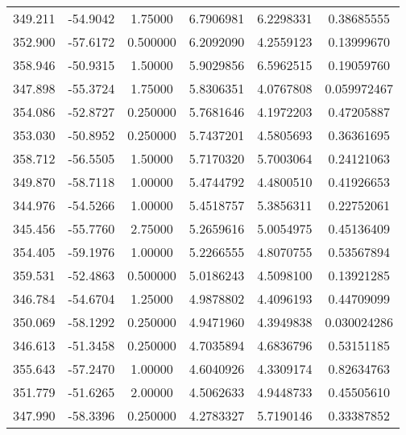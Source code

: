 \documentclass{article}
\begin{document}
\begin{tabular}{| c | c | c | c | c | c |}
      349.211 &      -54.9042 &       1.75000 &        6.7906981 & 
       6.2298331 &       0.38685555\\
      352.900 &      -57.6172 &      0.500000 &        6.2092090 & 
       4.2559123 &       0.13999670\\
      358.946 &      -50.9315 &       1.50000 &        5.9029856 & 
       6.5962515 &       0.19059760\\
      347.898 &      -55.3724 &       1.75000 &        5.8306351 & 
       4.0767808 &      0.059972467\\
      354.086 &      -52.8727 &      0.250000 &        5.7681646 & 
       4.1972203 &       0.47205887\\
      353.030 &      -50.8952 &      0.250000 &        5.7437201 & 
       4.5805693 &       0.36361695\\
      358.712 &      -56.5505 &       1.50000 &        5.7170320 & 
       5.7003064 &       0.24121063\\
      349.870 &      -58.7118 &       1.00000 &        5.4744792 & 
       4.4800510 &       0.41926653\\
      344.976 &      -54.5266 &       1.00000 &        5.4518757 & 
       5.3856311 &       0.22752061\\
      345.456 &      -55.7760 &       2.75000 &        5.2659616 & 
       5.0054975 &       0.45136409\\
      354.405 &      -59.1976 &       1.00000 &        5.2266555 & 
       4.8070755 &       0.53567894\\
      359.531 &      -52.4863 &      0.500000 &        5.0186243 & 
       4.5098100 &       0.13921285\\
      346.784 &      -54.6704 &       1.25000 &        4.9878802 & 
       4.4096193 &       0.44709099\\
      350.069 &      -58.1292 &      0.250000 &        4.9471960 & 
       4.3949838 &      0.030024286\\
      346.613 &      -51.3458 &      0.250000 &        4.7035894 & 
       4.6836796 &       0.53151185\\
      355.643 &      -57.2470 &       1.00000 &        4.6040926 & 
       4.3309174 &       0.82634763\\
      351.779 &      -51.6265 &       2.00000 &        4.5062633 & 
       4.9448733 &       0.45505610\\
      347.990 &      -58.3396 &      0.250000 &        4.2783327 & 
       5.7190146 &       0.33387852\\
      \hline  
\end{tabular}
\end{document}

